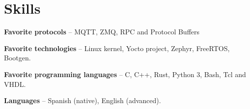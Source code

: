 \section{Skills}
\begin{small}
	\parbox[t][][t]{\linewidth}{
		\textbf{Favorite protocols} -- {MQTT, ZMQ, RPC and Protocol Buffers}
		\bigbreak
	}
	\parbox[t][][t]{\linewidth}{
		\textbf{Favorite technologies} -- {Linux kernel, Yocto project, Zephyr, FreeRTOS, Bootgen.}
		\bigbreak
	}
	\parbox[t][][t]{\linewidth}{
		\textbf{Favorite programming languages} -- {C, C++, Rust, Python 3, Bash, Tcl and VHDL.}
		\bigbreak
	}
	\parbox[t][][t]{\linewidth}{
		\textbf{Languages} -- {Spanish (native), English (advanced).}
		\bigbreak
	}
\end{small}
